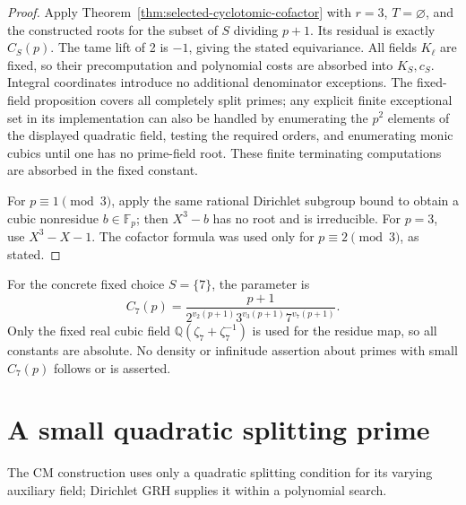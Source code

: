 \documentclass[11pt]{article}
\theoremstyle{definition}
\theoremstyle{remark}
\begin{document}
\begin{proof}
Apply Theorem~\ref{thm:selected-cyclotomic-cofactor} with \(r=3\),
\(T=\varnothing\), and the constructed roots for the subset
of \(S\) dividing \(p+1\). Its residual is exactly \(C_S(p)\).
The tame lift of 2 is \(-1\), giving the stated equivariance.
All fields \(K_\ell\) are fixed, so their precomputation and
polynomial costs are absorbed into \(K_S,c_S\).
Integral coordinates introduce no additional denominator exceptions.
The fixed-field proposition covers all completely split primes;
any explicit finite exceptional set in its implementation can also
be handled by enumerating the \(p^2\) elements of the displayed
quadratic field, testing the required orders, and enumerating monic
cubics until one has no prime-field root. These finite terminating
computations are absorbed in the fixed constant.

For \(p\equiv1\pmod3\), apply the same rational Dirichlet
subgroup bound to obtain a cubic nonresidue \(b\in\mathbb F_p\);
then \(X^3-b\) has no root and is irreducible. For \(p=3\),
use \(X^3-X-1\). The cofactor formula was used only for
\(p\equiv2\pmod3\), as stated.
\end{proof}

For the concrete fixed choice \(S=\{7\}\), the parameter is
\[
          C_7(p)=\frac{p+1}
          {2^{v_2(p+1)}3^{v_3(p+1)}7^{v_7(p+1)}}.
\]
Only the fixed real cubic field
\(\mathbb Q(\zeta_7+\zeta_7^{-1})\) is used for the residue map,
so all constants are absolute. No density or infinitude assertion
about primes with small \(C_7(p)\) follows or is asserted.

\section{A small quadratic splitting prime}
\label{sec:quadratic-splitting-input}
The CM construction uses only a quadratic splitting condition for its varying auxiliary field; Dirichlet GRH supplies it within a polynomial search.
\end{document}
